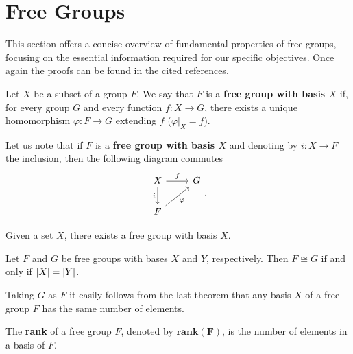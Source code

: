 \section{Free Groups}

This section offers a concise overview of fundamental properties of free groups, focusing on the essential information required for our specific objectives. 
Once again the proofs can be found in the cited references.

\begin{definition}
    Let $X$ be a subset of a group $F$. We say that $F$ is a \textbf{free group with basis $X$} if, for every group $G$ and every function $f \colon X \rightarrow G$, there exists a unique homomorphism $\varphi \colon F \rightarrow G$ extending $f$ ($\varphi |_X = f$).
\end{definition}

Let us note that if $F$ is a \textbf{free group with basis $X$} and denoting by $i \colon X \rightarrow F$ the inclusion, then the following diagram commutes 
    \[\begin{tikzcd}
        X & G \\
        F
        \arrow["f", from=1-1, to=1-2]
        \arrow["i"', from=1-1, to=2-1]
        \arrow["\varphi"', from=2-1, to=1-2]
    \end{tikzcd}.\]

\begin{theorem}
    \cite[Theorem 11.1]{RotmanITG}
    Given a set $X$, there exists a free group with basis $X$.
\end{theorem}

\begin{theorem}
    \cite[Theorem 11.4]{RotmanITG}
    Let $F$ and $G$ be free groups with bases $X$ and $Y$, respectively. 
    Then $F \cong G$ if and only if $| X | = | Y |$. 
\end{theorem}

Taking $G$ as $F$ it easily follows from the last theorem that any basis $X$ of a free group $F$ has the same number of elements.

\begin{definition}
    The \textbf{rank} of a free group $F$, denoted by $\mathbf{rank(F)}$, is the number of elements in a basis of $F$. 
\end{definition}